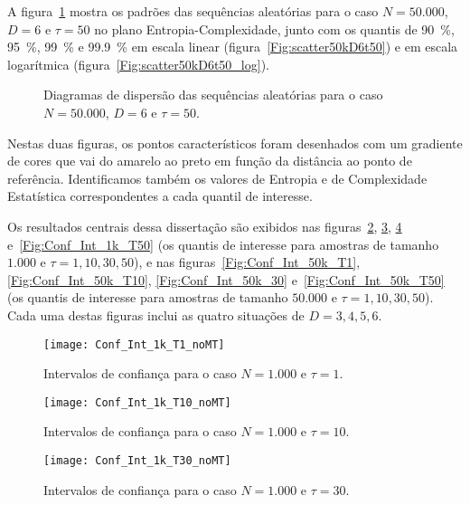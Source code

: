 A figura~\ref{Fig:QuantD3tau10log} mostra os padrões das sequências aleatórias para o caso $N=50.000$, $D=6$ e $\tau=50$ no plano Entropia-Complexidade, junto com os quantis de \SI{90}{\percent}, \SI{95}{\percent}, \SI{99}{\percent} e \SI{99,9}{\percent} em escala linear (figura~\ref{Fig:scatter50kD6t50}) e em escala logarítmica (figura~\ref{Fig:scatter50kD6t50_log}).

\begin{figure}
\centering
{}
\caption{Diagramas de dispersão das sequências aleatórias para o caso $N=50.000$, $D=6$ e $\tau=50$.}\label{Fig:QuantD3tau10log}
\end{figure}

Nestas duas figuras, os pontos característicos foram desenhados com um gradiente de cores que vai do amarelo ao preto em função da distância ao ponto de referência.
Identificamos também os valores de Entropia e de Complexidade Estatística correspondentes a cada quantil de interesse.

Os resultados centrais dessa dissertação são exibidos nas figuras~\ref{Fig:Conf_Int_1k_T1}, \ref{Fig:Conf_Int_1k_T10}, 
\ref{Fig:Conf_Int_1k_30} e~\ref{Fig:Conf_Int_1k_T50} (os quantis de interesse para amostras de tamanho $1.000$ e $\tau=1, 10, 30, 50$), e nas figuras~\ref{Fig:Conf_Int_50k_T1}, \ref{Fig:Conf_Int_50k_T10},
\ref{Fig:Conf_Int_50k_30} e~\ref{Fig:Conf_Int_50k_T50} (os quantis de interesse para amostras de tamanho $50.000$ e $\tau=1, 10, 30, 50$).
Cada uma destas figuras inclui as quatro situações de $D=3, 4, 5, 6$.

\begin{figure}
	\centering
	\texttt{[image: Conf\_Int\_1k\_T1\_noMT]}
	\caption{Intervalos de confiança para o caso $N=1.000$ e $\tau=1$.}\label{Fig:Conf_Int_1k_T1}
\end{figure}

\begin{figure}
	\centering
	\texttt{[image: Conf\_Int\_1k\_T10\_noMT]}
	\caption{Intervalos de confiança para o caso $N=1.000$ e $\tau=10$.}\label{Fig:Conf_Int_1k_T10}
\end{figure}

\begin{figure}
	\centering
	\texttt{[image: Conf\_Int\_1k\_T30\_noMT]}
	\caption{Intervalos de confiança para o caso $N=1.000$ e $\tau=30$.}\label{Fig:Conf_Int_1k_30}
\end{figure}

